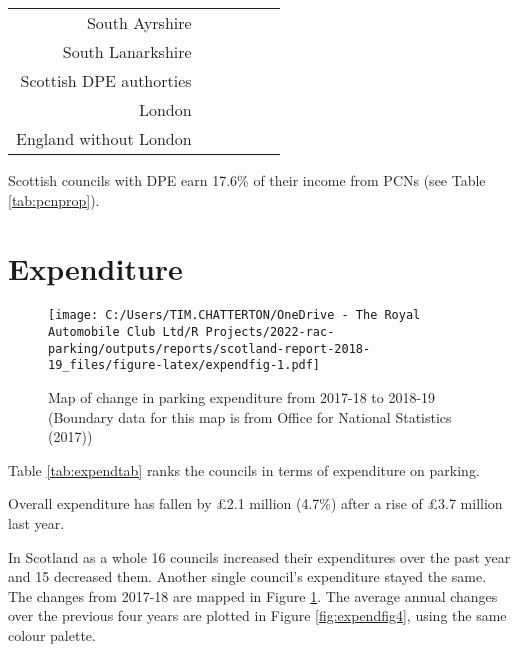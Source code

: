 \documentclass[
  12pt,
]{article}
\begin{document}
\begin{longtable}[t]{rrrrrr}
South Ayrshire & \cellcolor{white}{33.0\%} & \cellcolor{white}{} & \cellcolor{white}{16.7\%} & \cellcolor{white}{21.8\%} & \cellcolor{white}{22.3\%}\\
South Lanarkshire & \cellcolor{white}{31.9\%} & \cellcolor{white}{30.3\%} & \cellcolor{white}{32.1\%} & \cellcolor{white}{30.7\%} & \cellcolor{white}{31.5\%}\\
Scottish DPE authorties & \cellcolor{white}{19.7\%} & \cellcolor{white}{19.0\%} & \cellcolor{white}{20.0\%} & \cellcolor{white}{20.0\%} & \cellcolor{white}{20.0\%}\\
London & \cellcolor{white}{40.4\%} & \cellcolor{white}{49.3\%} & \cellcolor{white}{42.0\%} & \cellcolor{white}{43.1\%} & \cellcolor{white}{45.1\%}\\
England without London & \cellcolor{white}{10.9\%} & \cellcolor{white}{11.5\%} & \cellcolor{white}{12.8\%} & \cellcolor{white}{13.8\%} & \cellcolor{white}{12.3\%}\\*
\end{longtable}
\endgroup{}

Scottish councils with DPE earn 17.6\% of their income from PCNs (see Table \ref{tab:pcnprop}).

\hypertarget{expenditure}{%
\section{Expenditure}\label{expenditure}}

\begin{figure}
\centering
\texttt{[image: C:/Users/TIM.CHATTERTON/OneDrive - The Royal Automobile Club Ltd/R Projects/2022-rac-parking/outputs/reports/scotland-report-2018-19\_files/figure-latex/expendfig-1.pdf]}
\caption{\label{fig:expendfig}Map of change in parking expenditure from 2017-18 to 2018-19 (Boundary data for this map is from Office for National Statistics (2017))}
\end{figure}

Table \ref{tab:expendtab} ranks the councils in terms of expenditure on parking.

Overall expenditure has fallen by £2.1 million (4.7\%) after a rise of £3.7 million last year.

In Scotland as a whole 16 councils increased their expenditures over the past year and 15 decreased them. Another single council's expenditure stayed the same. The changes from 2017-18 are mapped in Figure \ref{fig:expendfig}. The average annual changes over the previous four years are plotted in Figure \ref{fig:expendfig4}, using the same colour palette.
\end{document}
